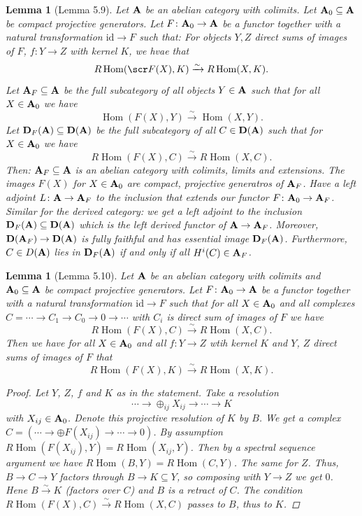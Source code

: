 \documentclass[A4paper, british]{amsart}
\theoremstyle{darkgreentheorem}
\newtheorem{lm}[thm]{Lemma}
\theoremstyle{darkbluedefinition}
\theoremstyle{darkredexample}
\theoremstyle{remark}
\DeclareMathOperator{\Hom}{Hom}
\newcommand{\1}{\mathbbm{1}}
\newcommand{\op}{\oplus}
\newcommand{\id}{\mathrm{id}}
\newcommand{\sub}{\subseteq}
\begin{document}
\begin{lm}[Lemma 5.9]
    Let $\mathbf{A}$ be an abelian category with colimits.
    Let $\bfA_{0}\sub \bfA$ be compact projective generators.
    Let $F\colon \mathbf{A}_{0}\to \mathbf{A}$ be a functor together with a natural transformation $\id\to F$ such that:
    For objects $Y,Z$ direct sums of images of $F$, $f\colon Y\to Z$ with kernel $K$, we hvae that
    \[ R\Hom(\F(X),K)\xrightarrow{\sim} R\Hom(X,K).\]
    Let $\bfA_{F}\sub \bfA$ be the full subcategory of all objects $Y\in \mathbf{A}$ such that for all $X\in \mathbf{A}_{0}$ we have
    \[ \Hom(F(X),Y)\xrightarrow{\sim}\Hom(X,Y).\]
    Let $\D_{F}(\bfA)\sub \D(\bfA)$ be the full subcategory of all $C\in \mathbf{D}(\mathbf{A})$ such that for $X\in \mathbf{A}_{0}$ we have
    \[ R\Hom(F(X),C)\xrightarrow{\sim}R\Hom(X,C).\]
    Then: $\bfA_{F}\sub \bfA$ is an abelian category with colimits, limits and extensions.
    The images $F(X)$ for $X\in \mathbf{A}_{0}$ are compact, projective generatros of $\mathbf{A}_{F}$.
    Have a left adjoint $L\colon \mathbf{A}\to \mathbf{A}_{F}$ to the inclusion that extends our functor $F\colon \mathbf{A}_{0}\to \mathbf{A}_{F}$.
    Similar for the derived category: we get a left adjoint to the inclusion $\D_{F}(\bfA)\sub \D(\bfA)$ which is the left derived functor of $\mathbf{A}\to \mathbf{A}_{F}$.
    Moreover, $\mathbf{D}(\mathbf{A}_{F})\to \mathbf{D}(\mathbf{A})$ is fully faithful and has essential image $\mathbf{D}_{F}(\mathbf{A})$.
    Furthermore, $C\in D(\mathbf{A})$ lies in $\mathbf{D}_{F}(\mathbf{A})$ if and only if all $H^{i}(C)\in \mathbf{A}_{F}$.
\end{lm}

\begin{lm}[Lemma 5.10]
    Let $\mathbf{A}$ be an abelian category with colimits and $\bfA_{0}\sub \bfA$ be compact projective generators.
    Let $F\colon \mathbf{A}_{0}\to \mathbf{A}$ be a functor together with a natural transformation $\id\to F$ such that for all $X\in \mathbf{A}_{0}$ and all complexes $C=\cdots\to C_{1}\to C_{0}\to 0\to \cdots $ with $C_{i}$ is direct sum of images of $F$ we have
    \[ R\Hom(F(X),C)\xrightarrow{\sim}R\Hom(X,C).\]
    Then we have for all $X\in \mathbf{A}_{0}$ and all $f\colon Y\to Z$ wtih kernel $K$ and $Y$, $Z$ direct sums of images of $F$ that
    \[ R\Hom(F(X),K)\xrightarrow{\sim}R\Hom(X,K).\]
    \begin{proof}
	Let $Y$, $Z$, $f$ and $K$ as in the statement.
	Take a resolution
	\[ \cdots \to \op_{ij}X_{ij}\to \cdots \to K\]
	with $X_{ij}\in \mathbf{A}_{0}$.
	Denote this projective resolution of $K$ by $B$.
	We get a complex $C=(\cdots \to \op F(X_{ij})\to \cdots \to 0)$.
	By assumption $R\Hom(F(X_{ij}),Y)=R\Hom(X_{ij},Y)$.
	Then by a spectral sequence argument we have $R\Hom(B,Y)=R\Hom(C,Y)$.
	The same for $Z$.
	Thus, $B\to C\to Y$ factors through $B\to K\sub Y$, so composing with $Y\to Z$ we get $0$.
	Hene $B\xrightarrow{\sim}K$ (factors over $C$) and $B$ is a retract of $C$.
	The condition $R\Hom(F(X),C)\xrightarrow{\sim}R\Hom(X,C)$ passes to $B$, thus to $K$.
    \end{proof}
\end{lm}
\end{document}

